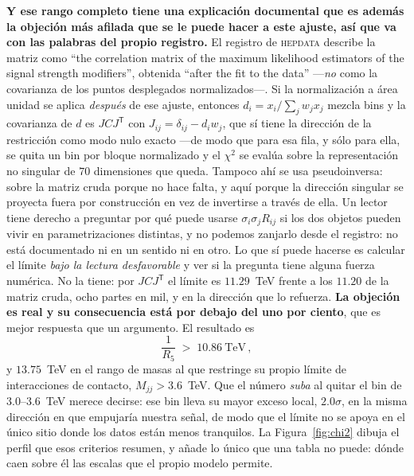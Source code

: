 \documentclass[11pt,a4paper]{article}
\begin{document}
\noindent\textbf{Y ese rango completo tiene una explicación documental que es además la objeción
más afilada que se le puede hacer a este ajuste, así que va con las palabras del propio registro.}
El registro de \textsc{hepdata} describe la matriz como ``the correlation matrix of the maximum
likelihood estimators of the signal strength modifiers'', obtenida ``after the fit to the data''
---\emph{no} como la covarianza de los puntos desplegados normalizados---. Si la normalización a
área unidad se aplica \emph{después} de ese ajuste, entonces $d_i=x_i/\sum_j w_jx_j$ mezcla bins y
la covarianza de $d$ es $JCJ^{\mathsf T}$ con $J_{ij}=\delta_{ij}-d_iw_j$, que sí tiene la
dirección de la restricción como modo nulo exacto ---de modo que para esa fila, y sólo para ella,
se quita un bin por bloque normalizado y el $\chi^2$ se evalúa sobre la representación no singular
de $70$ dimensiones que queda. Tampoco ahí se usa pseudoinversa: sobre la matriz cruda porque no
hace falta, y aquí porque la dirección singular se proyecta fuera por construcción en vez de
invertirse a través de ella. Un lector tiene derecho a preguntar por qué puede usarse
$\sigma_i\sigma_jR_{ij}$ si los dos objetos pueden vivir en parametrizaciones distintas, y no
podemos zanjarlo desde el registro: no está documentado ni en un sentido ni en otro. Lo que sí
puede hacerse es calcular el límite \emph{bajo la lectura desfavorable} y ver si la pregunta tiene
alguna fuerza numérica. No la tiene: por $JCJ^{\mathsf T}$ el límite es $11.29$~TeV frente a los
$11.20$ de la matriz cruda, ocho partes en mil, y en la dirección que lo refuerza. \textbf{La
objeción es real y su consecuencia está por debajo del uno por ciento}, que es mejor respuesta que
un argumento. El
resultado es
\begin{equation}\label{eq:tulimit}
  \frac{1}{R_5}\;>\;10.86\ \text{TeV}\,,
\end{equation}
y $13.75$~TeV en el rango de masas al que \cite{CMSangular} restringe su propio límite de
interacciones de contacto, $M_{jj}>3.6$~TeV. Que el número \emph{suba} al quitar el bin de
$3.0$--$3.6$~TeV merece decirse: ese bin lleva su mayor exceso local, $2.0\sigma$, en la misma
dirección en que empujaría nuestra señal, de modo que el límite no se apoya en el único sitio
donde los datos están menos tranquilos. La Figura~\ref{fig:chi2} dibuja el perfil que esos criterios resumen, y añade lo único que una tabla no puede: dónde caen sobre él las escalas que el propio modelo permite.
\end{document}
